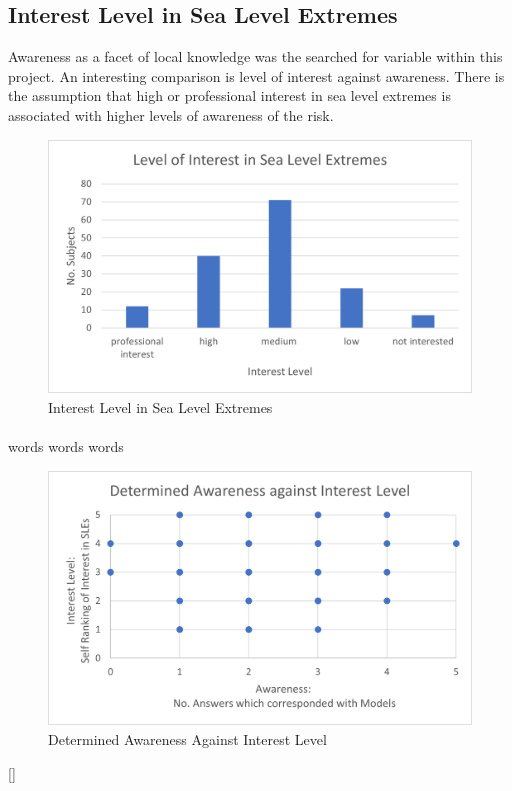 \subsection{Interest Level in Sea Level Extremes}
Awareness as a facet of local knowledge was the searched for variable within this project. An interesting comparison is level of interest against awareness. There is the assumption that high or professional interest in sea level extremes is associated with higher levels of awareness of the risk. 
\begin{figure}[h]
    \centering
    \includegraphics{fig_results/interest-level.png}
    \caption{Interest Level in Sea Level Extremes}
    \label{fig:my_label}
\end{figure}
\paragraph{}
words words words

\begin{figure}[h]
    \centering
    \includegraphics{fig_results/aware_vs_interest.png}
    \caption{Determined Awareness Against Interest Level}
    \label{fig:aware_vs_interest}
\end{figure}[]

